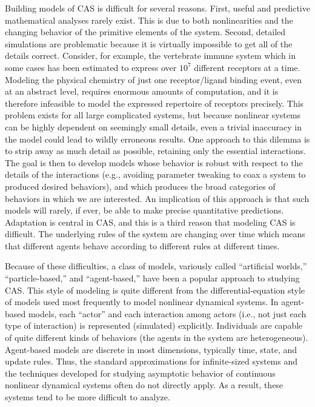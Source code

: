 Building models of CAS is difficult for several reasons.  First,
useful and predictive mathematical analyses rarely exist.  This is due
to both nonlinearities and the changing behavior of the primitive
elements of the system.  Second, detailed simulations are problematic
because it is virtually impossible to get all of the details correct.
Consider, for example, the vertebrate immune system which in some
cases has been estimated to express over $10^7$ different receptors at
a time.  Modeling the physical chemistry of just one receptor/ligand
binding event, even at an abstract level, requires enormous amounts of
computation, and it is therefore infeasible to model the expressed
repertoire of receptors precisely.  This problem exists for all large
complicated systems, but because nonlinear systems can be highly
dependent on seemingly small details, even a trivial inaccuracy in the
model could lead to wildly erroneous results.  One approach to this
dilemma is to strip away as much detail as possible, retaining only
the essential interactions.  The goal is then to develop models whose
behavior is robust with respect to the details of the interactions
(e.g., avoiding parameter tweaking to coax a system to produced
desired behaviors), and which produces the broad categories of
behaviors in which we are interested.  An implication of this approach
is that such models will rarely, if ever, be able to make precise
quantitative predictions.  Adaptation is central in CAS, and this is a
third reason that modeling CAS is difficult.  The underlying rules of
the system are changing over time which means that different agents
behave according to different rules at different times.

Because of these difficulties, a class of models, variously called
``artificial worlds,'' ``particle-based,'' and ``agent-based,'' have
been a popular approach to studying CAS.  This style of modeling is
quite different from the differential-equation style of models used
most frequently to model nonlinear dynamical systems.  In agent-based
models, each ``actor'' and each interaction among actors (i.e., not
just each type of interaction) is represented (simulated) explicitly.
Individuals are capable of quite different kinds of behaviors (the
agents in the system are heterogeneous).  Agent-based models are
discrete in most dimensions, typically time, state, and update rules.
Thus, the standard approximations for infinite-sized systems
and the techniques developed for studying asymptotic behavior of
continuous nonlinear dynamical systems often do not directly apply.
As a result, these systems tend to be more difficult to analyze.

